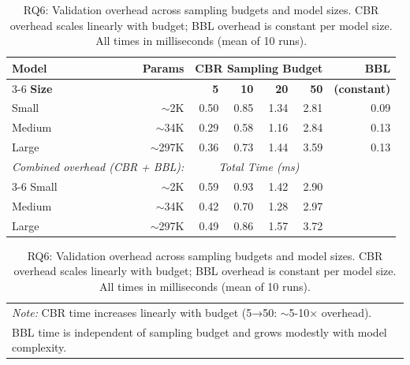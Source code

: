 \begin{table}[t]
\centering
\caption{RQ6: Validation overhead across sampling budgets and model sizes. CBR overhead scales linearly with budget; BBL overhead is constant per model size. All times in milliseconds (mean of 10 runs).}
\label{tab:rq6-overhead-full}
\small
\setlength{\tabcolsep}{5pt}
\begin{tabular}{l@{\hspace{8pt}}r@{\hspace{12pt}}rrrr@{\hspace{12pt}}r}
\toprule
\textbf{Model} & \textbf{Params} & \multicolumn{4}{c}{\textbf{CBR Sampling Budget}} & \textbf{BBL} \\
\cmidrule(lr){3-6}
\textbf{Size} & & \textbf{5} & \textbf{10} & \textbf{20} & \textbf{50} & \textbf{(constant)} \\
\midrule
Small   & $\sim$2K   & 0.50 & 0.85 & 1.34 & 2.81 & 0.09 \\
Medium  & $\sim$34K  & 0.29 & 0.58 & 1.16 & 2.84 & 0.13 \\
Large   & $\sim$297K & 0.36 & 0.73 & 1.44 & 3.59 & 0.13 \\
\midrule
\multicolumn{2}{l}{\textit{Combined overhead (CBR + BBL):}} & \multicolumn{4}{c}{\textit{Total Time (ms)}} & \\
\cmidrule(lr){3-6}
Small   & $\sim$2K   & 0.59 & 0.93 & 1.42 & 2.90 & \\
Medium  & $\sim$34K  & 0.42 & 0.70 & 1.28 & 2.97 & \\
Large   & $\sim$297K & 0.49 & 0.86 & 1.57 & 3.72 & \\
\bottomrule
\end{tabular}
\vspace{2mm}
\begin{tabular}{@{}l@{}}
\footnotesize
\textit{Note:} CBR time increases linearly with budget (5→50: $\sim$5-10× overhead). \\
\footnotesize
BBL time is independent of sampling budget and grows modestly with model complexity.
\end{tabular}
\end{table}
